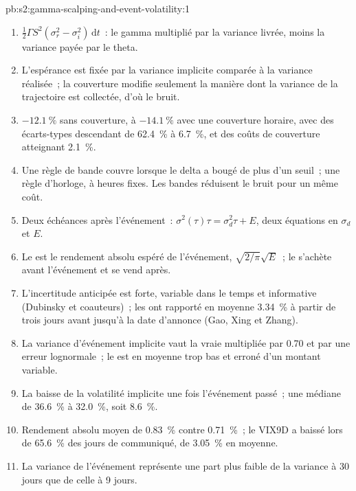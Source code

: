 \begin{solution}{pb:s2:gamma-scalping-and-event-volatility:1}
\begin{enumerate}
\item $\tfrac12\Gamma S^2(\sigma_r^2 - \sigma_i^2)\,\mathrm{d}t$~: le gamma multiplié par la variance livrée, moins la variance payée par le theta.
\item L'espérance est fixée par la variance implicite comparée à la variance réalisée~; la couverture modifie seulement la manière dont la variance de la trajectoire est collectée, d'où le bruit.
\item $-12.1~\%$ sans couverture, à $-14.1~\%$ avec une couverture horaire, avec des écarts-types descendant de 62.4~\% à 6.7~\%, et des coûts de couverture atteignant 2.1~\%.
\item Une règle de bande couvre lorsque le delta a bougé de plus d'un seuil~; une règle d'horloge, à heures fixes. Les bandes réduisent le bruit pour un même coût.
\item Deux échéances après l'événement~: $\sigma^2(\tau)\tau = \sigma_d^2\tau + E$, deux équations en $\sigma_d$ et $E$.
\item Le  est le rendement absolu espéré de l'événement, $\sqrt{2/\pi}\sqrt{E}$~; le  s'achète avant l'événement et se vend après.
\item L'incertitude anticipée est forte, variable dans le temps et informative (Dubinsky et coauteurs)~; les  ont rapporté en moyenne 3.34~\% à partir de trois
jours avant jusqu'à la date d'annonce (Gao, Xing et Zhang).
\item La variance d'événement implicite vaut la vraie multipliée par 0.70 et par une erreur lognormale~; le  est en moyenne trop bas et erroné
d'un montant variable.
\item La baisse de la volatilité implicite une fois l'événement passé~; une médiane de 36.6~\% à 32.0~\%, soit 8.6~\%.
\item Rendement absolu moyen de 0.83~\% contre 0.71~\%~; le VIX9D a baissé lors de 65.6~\% des jours de communiqué, de 3.05~\% en moyenne.
\item La variance de l'événement représente une part plus faible de la variance à 30 jours que de celle à 9 jours.

\end{enumerate}
\end{solution}
